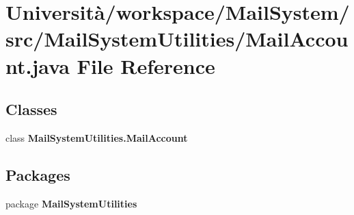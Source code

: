 \section{Università/workspace/\+Mail\+System/src/\+Mail\+System\+Utilities/\+Mail\+Account.java File Reference}
\label{_mail_account_8java}
\subsection*{Classes}
\begin{DoxyCompactItemize}
\item 
class \textbf{ Mail\+System\+Utilities.\+Mail\+Account}
\end{DoxyCompactItemize}
\subsection*{Packages}
\begin{DoxyCompactItemize}
\item 
package \textbf{ Mail\+System\+Utilities}
\end{DoxyCompactItemize}
